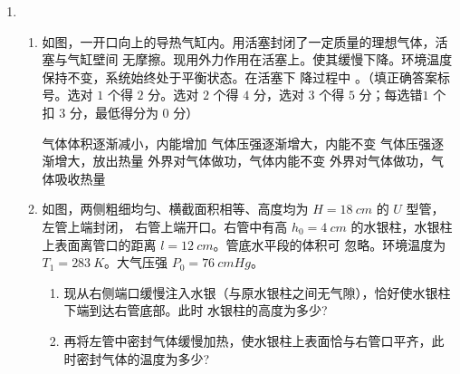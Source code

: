 \begin{enumerate}



\newpage




\item 
\begin{enumerate}
\item
如图，一开口向上的导热气缸内。用活塞封闭了一定质量的理想气体，活塞与气缸壁间
无摩擦。现用外力作用在活塞上。使其缓慢下降。环境温度保持不变，系统始终处于平衡状态。在活塞下
降过程中 \underlinegap 。（填正确答案标号。选对 $ 1 $ 个得 $ 2 $ 分。选对 $ 2 $ 个得 $ 4 $ 分，选对 $ 3 $ 个得 $ 5 $ 分；每选错$ 1 $ 个扣 $ 3 $ 分，最低得分为 $ 0 $ 分）
\begin{figure}[h!]
\centering

\end{figure}

\fivechoices
{气体体积逐渐减小，内能增加}
{气体压强逐渐增大，内能不变}
{气体压强逐渐增大，放出热量}
{外界对气体做功，气体内能不变}
{外界对气体做功，气体吸收热量}






\item 
如图，两侧粗细均匀、横截面积相等、高度均为 $ H=18 \ cm $ 的 $ U $ 型管，左管上端封闭，
右管上端开口。右管中有高 $ h_{0} =4 \ cm $ 的水银柱，水银柱上表面离管口的距离 $ l=12 \ cm $。管底水平段的体积可
忽略。环境温度为 $ T_{1} =283 \ K $。大气压强 $ P_0=76 \ cmHg $。
\begin{enumerate}
\item
现从右侧端口缓慢注入水银（与原水银柱之间无气隙），恰好使水银柱下端到达右管底部。此时
水银柱的高度为多少?
\item 
再将左管中密封气体缓慢加热，使水银柱上表面恰与右管口平齐，此时密封气体的温度为多少?
\end{enumerate}
\begin{figure}[h!]
\flushright

\end{figure}



\end{enumerate}
\end{enumerate}
